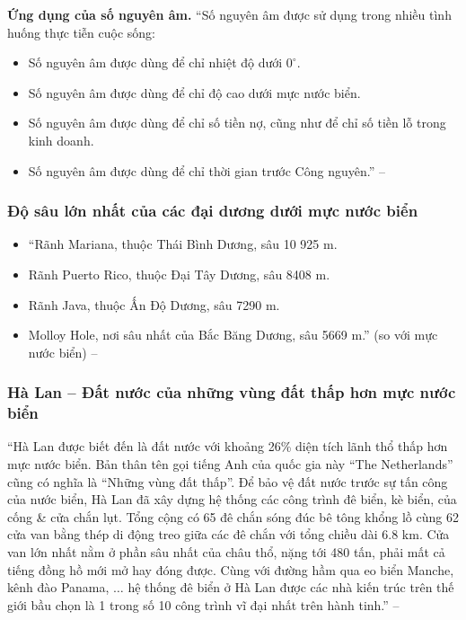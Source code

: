 \documentclass{article}
\numberwithin{equation}{section}
\begin{document}
\noindent\textbf{Ứng dụng của số nguyên âm.} ``Số nguyên âm được sử dụng trong nhiều tình huống thực tiễn cuộc sống:
\begin{itemize}
	\item Số nguyên âm được dùng để chỉ nhiệt độ dưới $0^\circ$.
	\item Số nguyên âm được dùng để chỉ độ cao dưới mực nước biển.
	\item Số nguyên âm được dùng để chỉ số tiền nợ, cũng như để chỉ số tiền lỗ trong kinh doanh.
	\item Số nguyên âm được dùng để chỉ thời gian trước Công nguyên.'' -- \cite[p. 62]{Thai_Anh_Dat_Ha_Loan_Nam_Quang_Toan_6_tap_1}
\end{itemize}

\subsubsection{Độ sâu lớn nhất của các đại dương dưới mực nước biển}
\begin{itemize}
	\item ``Rãnh Mariana, thuộc Thái Bình Dương, sâu 10 925 m.
	\item Rãnh Puerto Rico, thuộc Đại Tây Dương, sâu 8408 m.
	\item Rãnh Java, thuộc Ấn Độ Dương, sâu 7290 m.
	\item Molloy Hole, nơi sâu nhất của Bắc Băng Dương, sâu 5669 m.'' (so với mực nước biển) -- \cite[p. 63]{Thai_Anh_Dat_Ha_Loan_Nam_Quang_Toan_6_tap_1}
\end{itemize}

\subsubsection{Hà Lan -- Đất nước của những vùng đất thấp hơn mực nước biển}
``Hà Lan được biết đến là đất nước với khoảng 26\% diện tích lãnh thổ thấp hơn mực nước biển. Bản thân tên gọi tiếng Anh của quốc gia này ``The Netherlands'' cũng có nghĩa là ``Những vùng đất thấp''. Để bảo vệ đất nước trước sự tấn công của nước biển, Hà Lan đã xây dựng hệ thống các công trình đê biển, kè biển, của cống \& cửa chắn lụt. Tổng cộng có 65 đê chắn sóng đúc bê tông khổng lồ cùng 62 cửa van bằng thép di động treo giữa các đê chắn với tổng chiều dài 6.8 km. Cửa van lớn nhất nằm ở phần sâu nhất của châu thổ, nặng tới 480 tấn, phải mất cả tiếng đồng hồ mới mở hay đóng được. Cùng với đường hầm qua eo biển Manche, kênh đào Panama, $\ldots$ hệ thống đê biển ở Hà Lan được các nhà kiến trúc trên thế giới bầu chọn là 1 trong số 10 công trình vĩ đại nhất trên hành tinh.'' -- \cite[p. 63]{Thai_Anh_Dat_Ha_Loan_Nam_Quang_Toan_6_tap_1}
\end{document}
